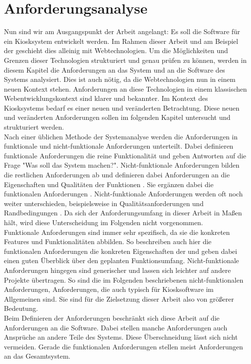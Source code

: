 \chapter{Anforderungsanalyse}
\label{sec:anforderungen}

Nun sind wir am Ausgangspunkt der Arbeit angelangt: Es soll die Software für ein Kiosksystem
entwickelt werden. Im Rahmen dieser Arbeit und am Beispiel der \shst{}
geschieht dies alleinig mit Webtechnologien. Um die Möglichkeiten und Grenzen dieser Technologien
strukturiert und genau prüfen zu können, werden in diesem Kapitel die Anforderungen an das System
und an die Software des Systems analysiert.
Dies ist auch nötig, da die Webtechnologien nun in einem neuen Kontext stehen. Anforderungen an diese
Technologien in einem klassischen Webentwicklungskontext sind klarer und bekannter. Im Kontext
des Kiosksystems bedarf es einer neuen und veränderten Betrachtung. 
Diese neuen und veränderten Anforderungen sollen im folgenden Kapitel untersucht und strukturiert
werden.\\

Nach einer üblichen Methode der Systemanalyse werden die Anforderungen in funktionale und 
nicht-funktionale Anforderungen unterteilt. Dabei definieren funktionale Anforderungen die 
reine Funktionalität und geben Antworten 
auf die Frage "Was soll das System machen?". Nicht-funktionale Anforderungen bilden die
restlichen Anforderungen ab und definieren dabei Anforderungen an die Eigenschaften und Qualitäten der
Funktionen \cite[S.20 f.]{systemanalyse}. Sie ergänzen dabei die funktionalen 
Anforderungen \cite{systematisches}. Nicht-funktionale Anforderungen werden oft noch weiter unterschieden,
beispielsweise in Qualitätsanforderungen und Randbedingungen \cite{systemanalyse,systematisches}.
Da sich der Anforderungsumfang in dieser Arbeit in Maßen hält, wird diese Unterscheidung im Folgenden
nicht vorgenommen.\\
Funktionale Anforderungen sind immer sehr spezifisch, da sie die konkreten Features
und Funktionalitäten abbilden. So beschreiben auch hier die funktionalen Anforderungen die konkreten
Eigenschaften der \shst{} und geben dabei einen guten Überblick über den geplanten Funktionsumfang.
Nicht-funktionale Anforderungen hingegen sind generischer und lassen sich leichter auf andere Projekte
übertragen. So sind die im Folgenden beschriebenen nicht-funktionalen Anforderungen, Anforderungen, die
auch typisch für Kiosksoftware im Allgemeinen sind. Sie sind für die Zielsetzung dieser Arbeit also von 
größerer Bedeutung.\\
Beim Definieren der Anforderungen beschränkt sich diese Arbeit auf die Anforderungen an die Software.
Dabei stellen manche Anforderungen auch Ansprüche an andere Teile des Systems. Diese Überschneidung
lässt sich nicht vermeiden. Gerade die funktionalen Anforderungen stellen meist Anforderungen an das 
Gesamtsystem.\\ 


